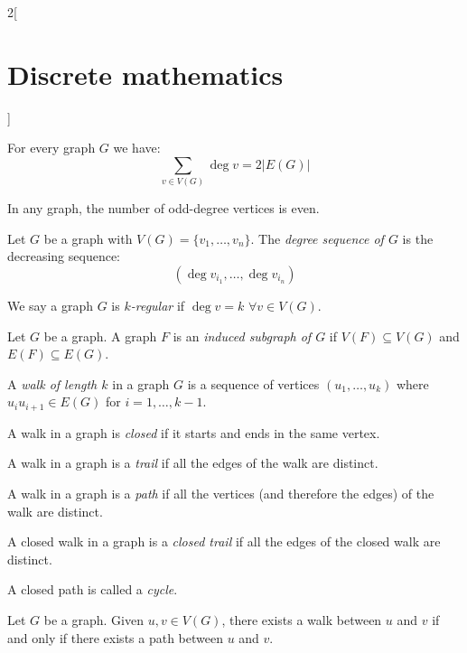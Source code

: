 \documentclass[../../../main.tex]{subfiles}
\begin{document}
\begin{multicols}{2}[\section{Discrete mathematics}]
\begin{lemma}
        For every graph $G$ we have: $$\sum_{v\in V(G)}\deg v=2|E(G)|$$
    \end{lemma}
    \begin{corollary}
        In any graph, the number of odd-degree vertices is even.
    \end{corollary}
    \begin{definition}
        Let $G$ be a graph with $V(G)=\{v_1,\ldots,v_n\}$. The \textit{degree sequence of $G$} is the decreasing sequence: $$(\deg v_{i_1},\ldots,\deg v_{i_n})$$
    \end{definition}
    \begin{definition}
        We say a graph $G$ is \textit{$k$-regular} if $\deg v=k$ $\forall v\in V(G)$.
    \end{definition}
    \begin{definition}
        Let $G$ be a graph. A graph $F$ is an \textit{induced subgraph of $G$} if $V(F)\subseteq V(G)$ and $E(F)\subseteq E(G)$.
    \end{definition}
    \begin{definition}
        A \textit{walk of length $k$} in a graph $G$ is a sequence of vertices $(u_1,\ldots,u_k)$ where $u_iu_{i+1}\in E(G)$ for $i=1,\ldots,k-1$.
    \end{definition}
    \begin{definition}
        A walk in a graph is \textit{closed} if it starts and ends in the same vertex.
    \end{definition}
    \begin{definition}
        A walk in a graph is a \textit{trail} if all the edges of the walk are distinct.
    \end{definition}
    \begin{definition}
        A walk in a graph is a \textit{path} if all the vertices (and therefore the edges) of the walk are distinct.
    \end{definition}
    \begin{definition}
        A closed walk in a graph is a \textit{closed trail} if all the edges of the closed walk are distinct.
    \end{definition}
    \begin{definition}
        A closed path is called a \textit{cycle}.
    \end{definition}
    \begin{prop}
        Let $G$ be a graph. Given $u,v\in V(G)$, there exists a walk between $u$ and $v$ if and only if there exists a path between $u$ and $v$.

\end{prop}
\end{multicols}
\end{document}
